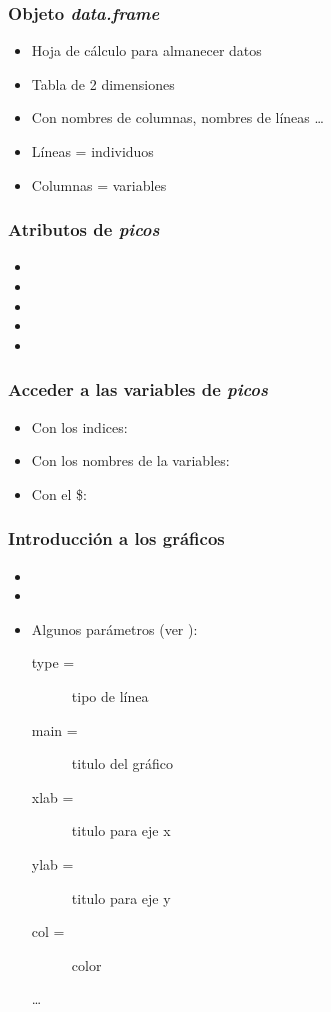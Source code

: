 \documentclass[mathserif]{beamer}
\begin{document}
\begin{frame}[plain,label=d21]%
\frametitle{Objeto \emph{data.frame}}
\begin{itemize}
   \item Hoja de c\'alculo para almanecer datos
   \item Tabla de 2 dimensiones 
   \item Con nombres de columnas, nombres de l\'ineas \ldots
   \item L\'ineas = individuos
   \item Columnas = variables
\end{itemize}
\end{frame}%

\begin{frame}[plain,label=d22]%
\frametitle{Atributos de \emph{picos}}
\begin{itemize}
\item {}
\item {}
\item {}
\item {}
\item {}
\end{itemize}
\end{frame}%

\begin{frame}[plain,label=d22bis]%
\frametitle{Acceder a las variables de \emph{picos}}
\begin{itemize}
   \item Con los indices: 
   \item Con los nombres de la variables: 
   \item Con el \$: 
\end{itemize}
\end{frame}%

\begin{frame}[plain,label=d23]%
\frametitle{Introducci\'on a los gr\'aficos}
\begin{itemize}
\item {}
\item {}
\item Algunos par\'ametros (ver ): 
   \begin{description}
      \item[type =] tipo de l\'inea
      \item[main =] titulo del gr\'afico
      \item[xlab =] titulo para eje x
      \item[ylab =] titulo para eje y
      \item[col =] color
      \item[\ldots]
   \end{description}
\end{itemize}
\end{frame}%
\end{document}
